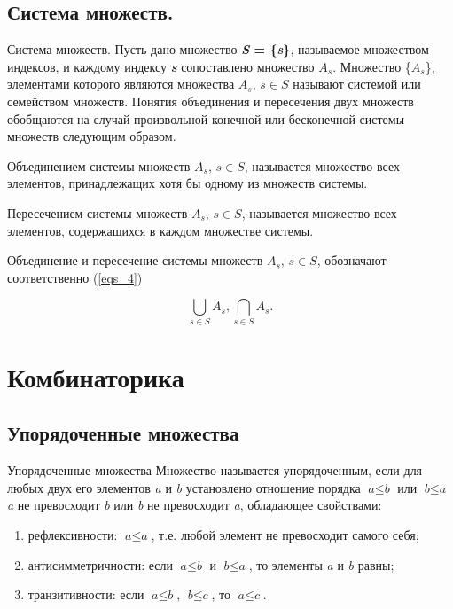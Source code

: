 \documentclass{beamer}
\begin{document}
    \subsection{Система множеств.}
    \begin{frame}{Система множеств.}
        \fontsize{10}{8}\selectfont Пусть дано множество \textbf{\textit{S} = \{\textbf{\textit{s}}\}}, называемое множеством индексов, и каждому индексу \textbf{\textit{s}} сопоставлено множество  \textbf{\textit{$A_s$}}. Множество \{$A_s$\},  элементами которого являются множества \textbf{\textit{$A_s$}}, $s \in S$ называют системой или семейством множеств. Понятия объединения и пересечения двух множеств обобщаются на случай произвольной конечной или бесконечной системы множеств следующим образом.

        Объединением системы множеств $A_s$, $s \in S$, называется множество всех элементов, принадлежащих хотя бы одному из множеств системы.

        Пересечением системы множеств $A_s$, $s \in S$, называется множество всех элементов, содержащихся в каждом множестве системы.

        Объединение и пересечение системы множеств $A_s$, $s \in S$, обозначают соответственно (\ref{eqs_4})

        \begin{equation}
            \label{eqs_4}
            \bigcup_{s \in S} A_s,  \bigcap_{s \in S} A_s.
        \end{equation}
    \end{frame}

    \section{Комбинаторика}

    \subsection{Упорядоченные множества}
    \begin{frame}{Упорядоченные множества}
        \fontsize{10}{8}\selectfont Множество называется упорядоченным, если для любых двух его элементов \textit{a} и \textit{b} установлено отношение порядка $\textit{a} \leq \textit{b}$ или $\textit{b} \leq \textit{a}$ \textit{a} не превосходит \textit{b} или \textit{b} не превосходит \textit{a}, обладающее свойствами:

        \begin{enumerate}
            \item рефлексивности: $\textit{a} \leq \textit{a}$, т.е. любой элемент не превосходит
            самого себя;
            \item антисимметричности: если $\textit{a} \leq \textit{b}$ и $\textit{b} \leq \textit{a}$, то элементы \textit{a} и \textit{b} равны;
            \item транзитивности: если $\textit{a} \leq \textit{b}$, $\textit{b} \leq \textit{c}$, то $\textit{a} \leq \textit{c}$.
        \end{enumerate}
    \end{frame}
\end{document}
